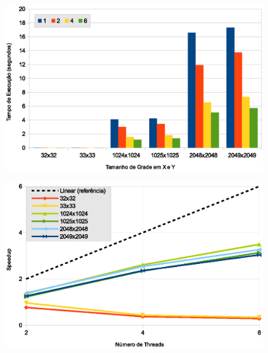 \begin{figure}[H]
    \centering
    \begin{minipage}{.5\textwidth}
        \includegraphics[width=\textwidth]{figures/exectime-v2}
        \label{subfig:exectime-v2}
    \end{minipage}%
    \begin{minipage}{.5\textwidth}
        \includegraphics[width=\textwidth]{figures/speedup-v2}
        \label{subfig:speedup-v2}
    \end{minipage}


\end{figure}

